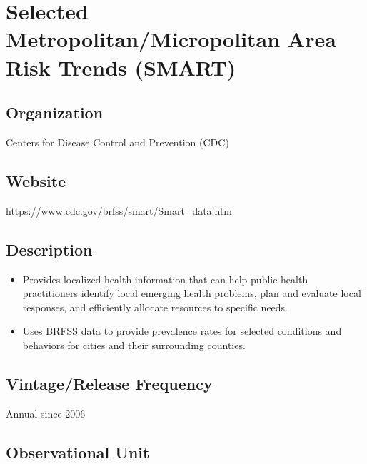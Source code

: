 \documentclass[
]{book}
\providecommand{\tightlist}{%
  \setlength{\itemsep}{0pt}\setlength{\parskip}{0pt}}
\begin{document}
\mainmatter

\hypertarget{selected-metropolitanmicropolitan-area-risk-trends-smart}{%
\chapter{Selected Metropolitan/Micropolitan Area Risk Trends (SMART)}\label{selected-metropolitanmicropolitan-area-risk-trends-smart}}

\hypertarget{organization-78}{%
\section{Organization}\label{organization-78}}

Centers for Disease Control and Prevention (CDC)

\hypertarget{website-78}{%
\section{Website}\label{website-78}}

\url{https://www.cdc.gov/brfss/smart/Smart_data.htm}

\hypertarget{description-78}{%
\section{Description}\label{description-78}}

\begin{itemize}
\tightlist
\item
  Provides localized health information that can help public health practitioners identify local emerging health problems, plan and evaluate local responses, and efficiently allocate resources to specific needs.
\item
  Uses BRFSS data to provide prevalence rates for selected conditions and behaviors for cities and their surrounding counties.
\end{itemize}

\hypertarget{vintagerelease-frequency-78}{%
\section{Vintage/Release Frequency}\label{vintagerelease-frequency-78}}

Annual since 2006

\hypertarget{observational-unit-78}{%
\section{Observational Unit}\label{observational-unit-78}}
\end{document}
